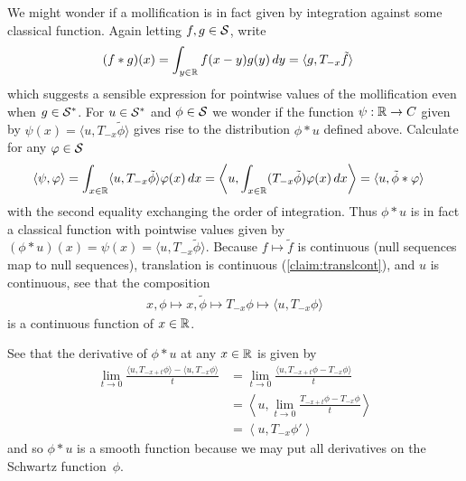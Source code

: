     We might wonder if a mollification is in fact given by integration against some classical function.
    Again letting $f,g\in\S$, write
    \begin{align*}
      (f*g)(x)
      &= \int_{y\in\R} f(x-y)g(y)\,dy
      = \langle g, T_{-x}\tilde f\rangle
    \end{align*}
    which suggests a sensible expression for pointwise values of the mollification even when $g\in\SS$.
    For $u\in\SS$ and $\phi\in\S$ we wonder if the function $\psi:\R\rightarrow
    C$ given by $\psi(x)=\langle u, T_{-x}\tilde \phi\rangle$ gives rise to the distribution $\phi*u$ defined above.
    Calculate for any $\varphi\in\S$
    \begin{align*}
      \left\langle \psi, \varphi \right\rangle
      &= \int_{x\in\R} \langle u,T_{-x}\tilde\phi\rangle\varphi(x)\,dx
      = \left\langle u, \int_{x\in\R} (T_{-x}\tilde\phi)\varphi(x)\,dx \right\rangle
      = \langle u, \tilde\phi*\varphi\rangle
    \end{align*}
    with the second equality exchanging the order of integration.
    Thus $\phi*u$ is in fact a classical function with pointwise values given by $(\phi*u)(x)=\psi(x)=\langle u, T_{-x}\tilde\phi\rangle$.
    Because $f\mapsto\tilde f$ is continuous (null sequences map to null sequences), translation is continuous (\cref{claim:translcont}), and $u$ is continuous, see that the composition
    \begin{align*}
      x, \phi \mapsto x, \tilde\phi \mapsto T_{-x}\phi \mapsto \langle u, T_{-x}\phi \rangle
    \end{align*}
    is a continuous function of $x\in\R$.
    
    See that the derivative of $\phi*u$ at any $x\in\R$ is given by
    \begin{align*}
      \lim_{t\rightarrow0} \frac{\langle u, T_{-x+t}\phi\rangle - \langle u, T_{-x}\phi\rangle}{t}
      &= \lim_{t\rightarrow0} \frac{\langle u, T_{-x+t}\phi-T_{-x}\phi\rangle}{t}
      \\&= \left\langle u, \lim_{t\rightarrow0} \frac{T_{-x+t}\phi-T_{-x}\phi}{t}\right\rangle
      \\&= \left\langle u, T_{-x}\phi'\right\rangle
    \end{align*}
    and so $\phi*u$ is a smooth function because we may put all derivatives on the Schwartz function~$\phi$.

